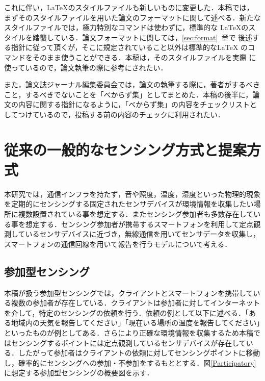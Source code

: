 \documentclass[submit,techrep]{ipsj}
\begin{document}
これに伴い，\LaTeX のスタイルファイルも新しいものに変更した．本稿では，
まずそのスタイルファイルを用いた論文のフォーマットに関して述べる．新たな
スタイルファイルでは，極力特別なコマンドは使わずに，標準的な \LaTeX のス
タイルを踏襲している．論文フォーマットに関しては，\ref{sec:format}~章で
後述する指針に従って頂くが，そこに規定されていること以外は標準的な\LaTeX
のコマンドをそのまま使うことができる．本稿は，そのスタイルファイルを実際
に使っているので，論文執筆の際に参考にされたい．



また，論文誌ジャーナル編集委員会では，論文の執筆する際に，著者がするべき
こと，するべきでないことを「べからず集」としてまとめた．本稿の後半に，論
文の内容に関する指針になるように，「べからず集」の内容をチェックリストと
してつけているので，投稿する前の内容のチェックに利用されたい．

\section{従来の一般的なセンシング方式と提案方式}
本研究では，通信インフラを持たず，音や照度，温度，湿度といった物理的現象を定期的にセンシングする固定されたセンサデバイスが環境情報を収集したい場所に複数設置されている事を想定する．またセンシング参加者も多数存在している事を想定する．センシング参加者が携帯するスマートフォンを利用して定点観測しているセンサデバイスに近づき，無線通信を用いてセンサデータを収集し，スマートフォンの通信回線を用いて報告を行うモデルについて考える．

\subsection{参加型センシング}
本稿が扱う参加型センシングでは，クライアントとスマートフォンを携帯している複数の参加者が存在している．クライアントは参加者に対してインターネットを介して，特定のセンシングの依頼を行う．依頼の例として以下に述べる．「ある地域内の天気を報告してください」「現在いる場所の温度を報告してください」といったものが例としてある．さらにより正確な環境情報を収集するため本稿ではセンシングするポイントには定点観測しているセンサデバイスが存在している．したがって参加者はクライアントの依頼に対してセンシングポイントに移動し，確率的にセンシングへの参加・不参加をするもととする．図\ref{Participatory}に想定する参加型センシングの概要図を示す．
\end{document}
